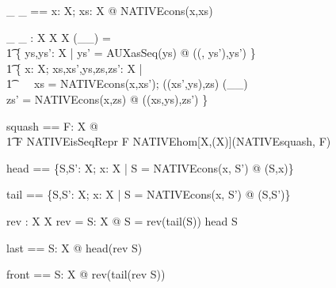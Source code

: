 \documentclass{article}
\begin{document}
\begin{axdef}[X]
  \_ \zscons \_ == 
    \lambda x: \assumed X; xs: \assumed \seq X @ NATIVEcons(x,xs)
\end{axdef}


\begin{axdef}[X]
   \_ \cat \_ : \assumed \seq X \cross \seq X \fun \seq X
\where
   (\_\cat\_) = \\\t1
     \{ ys,ys': \assumed \seq X | ys' = AUXasSeq(ys) 
                                @ ((\emptyset, ys'),ys') \} \cup \\\t1
     \{ 
        x: \assumed X; xs,xs',ys,zs,zs': \assumed \seq X | \\\t1 ~ ~
        xs = NATIVEcons(x,xs'); ((xs',ys),zs) \in (\_\cat\_) \\
        zs' = NATIVEcons(x,zs) @
        ((xs,ys),zs')
     \}
\end{axdef}



\begin{axdef}[X]
  squash == 
    \lambda F: \assumed \nat \ffun X @ \\\t1
      \IF F \in NATIVEisSeqRepr \THEN F
      \ELSE NATIVEhom[\nat \cross X,\power(\nat \cross X)](NATIVEsquash, F)
\end{axdef}
      

\begin{axdef}[X]
  head == \{S,S': \assumed \seq X; x: \assumed X |
              S = NATIVEcons(x, S') @ (S,x)\}
\end{axdef}

\begin{axdef}[X]
  tail == \{S,S': \assumed \seq X; x: \assumed X |
              S = NATIVEcons(x, S') @ (S,S')\}
\end{axdef}

\begin{axdef}[X]
  rev : \assumed \seq X \fun \seq X
\where
  rev = \lambda S: \assumed \seq X @
             \IF S = \emptyset \THEN \emptyset
             \ELSE rev(tail(S)) \cat \langle head S \rangle
\end{axdef}

\begin{axdef}[X]
  last == \lambda S: \assumed \seq X @ head(rev S)
\end{axdef}

\begin{axdef}[X]
  front == \lambda S: \assumed \seq X @ rev(tail(rev S))
\end{axdef}
\end{document}
